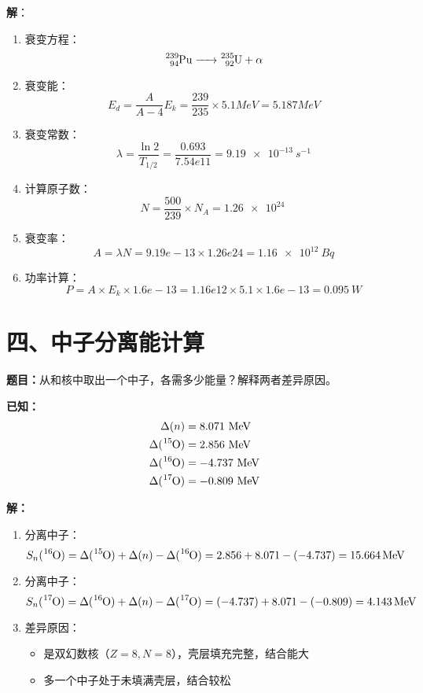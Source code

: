 \documentclass{article}
\begin{document}
\textbf{解}：
\begin{enumerate}
  \item 衰变方程：
  $$
  \ce{^{239}_{94}Pu -> ^{235}_{92}U + }\alpha
  $$

  \item 衰变能：
  $$
  E_d = \frac{A}{A-4}E_k = \frac{239}{235} \times 5.1 MeV = 5.187 MeV
  $$
  
  \item 衰变常数：
  $$
  \lambda = \frac{\ln 2}{T_{1/2}} = \frac{0.693}{7.54e11} = \SI{9.19e-13}{s^{-1}}
  $$
  
  \item 计算原子数：
  $$
  N = \frac{500}{239} \times N_A = \SI{1.26e24}{}
  $$
  
  \item 衰变率：
  $$
  A = \lambda N = 9.19e-13 \times 1.26e24 = \SI{1.16e12}{Bq}
  $$
  
  \item 功率计算：
  $$
  P = A \times E_k \times 1.6e-13 = 1.16e12 \times 5.1 \times 1.6e-13 = \SI{0.095}{W}
  $$
\end{enumerate}






\section*{四、中子分离能计算}
\textbf{题目：}从和核中取出一个中子，各需多少能量？解释两者差异原因。

\textbf{已知：}
$$
\begin{aligned}
\Delta(n) &= 8.071\ \si{MeV} \\
\Delta(\ce{^{15}O}) &= 2.856\ \si{MeV} \\
\Delta(\ce{^{16}O}) &= -4.737\ \si{MeV} \\
\Delta(\ce{^{17}O}) &= -0.809\ \si{MeV}
\end{aligned}
$$

\textbf{解：}
\begin{enumerate}
  \item {}分离中子：
  $$
  S_n(\ce{^{16}O}) = \Delta(\ce{^{15}O}) + \Delta(n) - \Delta(\ce{^{16}O}) = 2.856 + 8.071 - (-4.737) = \SI{15.664}{MeV}
  $$
  
  \item {}分离中子：
  $$
  S_n(\ce{^{17}O}) = \Delta(\ce{^{16}O}) + \Delta(n) - \Delta(\ce{^{17}O}) = (-4.737) + 8.071 - (-0.809) = \SI{4.143}{MeV}
  $$
  
  \item 差异原因：
  \begin{itemize}
    \item {}是双幻数核（$Z=8,N=8$），壳层填充完整，结合能大
    \item {}多一个中子处于未填满壳层，结合较松
  \end{itemize}
\end{enumerate}
\end{document}
